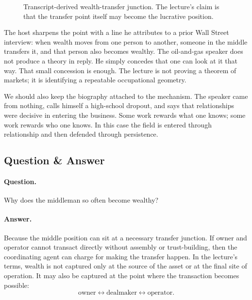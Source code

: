 \begin{figure}
\centering
{}
\caption{Transcript-derived wealth-transfer junction. The lecture's claim is that the transfer point itself may become the lucrative position.}
\end{figure}

The host sharpens the point with a line he attributes to a prior Wall Street interview: when wealth moves from one person to another, someone in the middle transfers it, and that person also becomes wealthy. The oil-and-gas speaker does not produce a theory in reply. He simply concedes that one can look at it that way. That small concession is enough. The lecture is not proving a theorem of markets; it is identifying a repeatable occupational geometry.

We should also keep the biography attached to the mechanism. The speaker came from nothing, calls himself a high-school dropout, and says that relationships were decisive in entering the business. Some work rewards what one knows; some work rewards who one knows. In this case the field is entered through relationship and then defended through persistence.

\subsection{Question \& Answer}

\paragraph{Question.} Why does the middleman so often become wealthy?

\paragraph{Answer.} Because the middle position can sit at a necessary transfer junction. If owner and operator cannot transact directly without assembly or trust-building, then the coordinating agent can charge for making the transfer happen. In the lecture's terms, wealth is not captured only at the source of the asset or at the final site of operation. It may also be captured at the point where the transaction becomes possible:
\[
\text{owner}\longleftrightarrow \text{dealmaker}\longleftrightarrow \text{operator}.
\]


